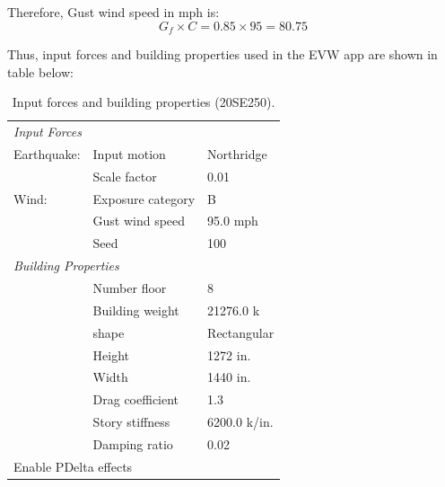 \documentclass{simcenterdocumentation}
\begin{document}
Therefore, Gust wind speed in mph is:
\begin{equation*}
G_f \times C = 0.85 \times 95 = \boxed{80.75}
\end{equation*}

Thus, input forces and building properties used in the EVW app are shown in table below:

\begin{table}[H]
	\centering \caption{Input forces and building properties (20SE250).}
	\begin{tabular}{lll}
	\toprule
	\multicolumn{3}{l}{\textit{Input Forces}}					\\
	\cmidrule(rl){1-3}
	Earthquake:		& Input motion		& Northridge			\\
					& Scale factor		& 0.01					\\
	Wind:			& Exposure category	& B						\\
					& Gust wind speed	& 95.0 mph				\\
					& Seed				& 100					\\
	\midrule
	\multicolumn{3}{l}{\textit{Building Properties}}			\\
	\cmidrule(rl){1-3}
					& Number floor		& 8						\\
					& Building weight	& 21276.0 k				\\
					& shape				& Rectangular			\\
					& Height			& 1272 in.				\\
					& Width				& 1440 in.				\\
					& Drag coefficient	& 1.3					\\
					& Story stiffness	& 6200.0 k/in.			\\
					& Damping ratio		& 0.02					\\
	\midrule
	\multicolumn{3}{l}{Enable PDelta effects}					\\
	\bottomrule
	\end{tabular}
\end{table}
\end{document}

